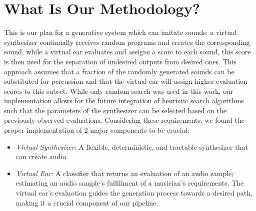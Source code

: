\documentclass[\main/thesis.tex]{subfiles}
\begin{document}

\section{What Is Our Methodology?}
\label{sec_methodology}
This is our plan for a generative system which can imitate sounds: a virtual synthesizer continually receives random programs and creates the corresponding sound, while a virtual ear evaluates and assigns a score to each sound, this score is then used for the separation of undesired outputs from desired ones. This approach assumes that a fraction of the randomly generated sounds can be substituted for percussion and that the virtual ear will assign higher evaluation scores to this subset. While only random search was used in this work, our implementation allows for the future integration of heuristic search algorithms such that the parameters of the synthesizer can be selected based on the previously observed evaluations. Considering these requirements, we found the proper implementation of 2 major components to be crucial:

\begin{itemize}
    \item \textit{Virtual Synthesizer}: A flexible, deterministic, and tractable synthesizer that can create audio. 
    \item \textit{Virtual Ear}: A classifier that returns an evaluation of an audio sample; estimating an audio sample's fulfillment of a musician's requirements. The virtual ear's evaluation guides the generation process towards a desired path, making it a crucial component of our pipeline. 
\end{itemize}
\end{document}
